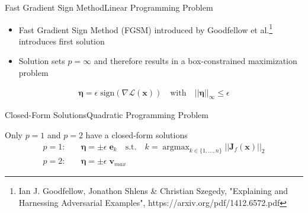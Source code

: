 \documentclass[xcolor={cmyk}]{beamer}
\newcommand{\mcl}{\mathcal}
\newcommand{\bm}{\boldsymbol}
\DeclareMathOperator*{\argmax}{argmax}
\begin{document}
\begin{frame}{Fast Gradient Sign Method}{Linear Programming Problem}

\begin{itemize}
	\item Fast Gradient Sign Method (FGSM) introduced by Goodfellow et al.\footnote{Ian J. Goodfellow, Jonathon Shlens \& Christian Szegedy, "Explaining and Harnessing Adversarial Examples", https://arxiv.org/pdf/1412.6572.pdf} introduces first solution
	\item Solution sets $p = \infty$ and therefore results in a box-constrained maximization problem
\end{itemize}

\begin{equation*}
\begin{aligned}
	\bm{\eta} = \epsilon \; \text{sign}( \nabla \mcl{L(\bm{x})}) \quad \text{with} \quad \lvert\lvert \bm{\eta} \rvert\rvert_{\infty} \leq \epsilon
\end{aligned}
\end{equation*}

\end{frame}

\begin{frame}{Closed-Form Solutions}{Quadratic Programming Problem}

	Only $p=1$ and $p=2$ have a closed-form solutions \\[20pt]

	\begin{equation*}
	\begin{aligned}
	p = 1: \quad &\bm{\eta} = \pm \epsilon \; \bm{e}_{k} \quad \text{s.t.} \quad k = \argmax_{k \in \{1, ..., n\}} \lvert\lvert \bm{J}_f(\bm{x}) \rvert\rvert_2 \\[20pt]
	p = 2: \quad &\bm{\eta} = \pm \epsilon \; \bm{v}_{max}
	\end{aligned}
	\label{quadraticclosedform}
	\end{equation*}

\end{frame}
\end{document}
